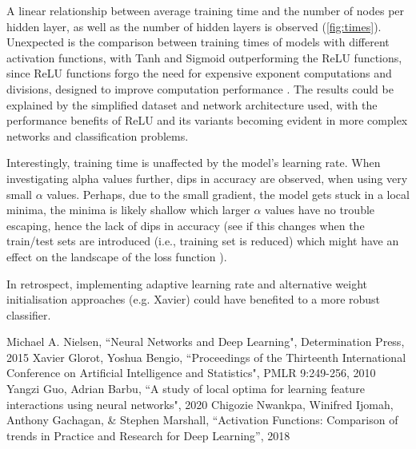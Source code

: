 \documentclass[12pt]{article}
\begin{document}
A linear relationship between average training time and the number of nodes per hidden layer, as well as the number of hidden layers is observed (\ref{fig:times}). Unexpected is the comparison between training times of models with different activation functions, with Tanh and Sigmoid outperforming the ReLU functions, since ReLU functions forgo the need for expensive exponent computations and divisions, designed to improve computation performance \cite{Niwa}. The results could be explained by the simplified dataset and network architecture used, with the performance benefits of ReLU and its variants becoming evident in more complex networks and classification problems.

Interestingly, training time is unaffected by the model's learning rate. When investigating alpha values further, dips in accuracy are observed, when using very small $\alpha$ values. Perhaps, due to the small gradient, the model gets stuck in a local minima, the minima is likely shallow which larger $\alpha$ values have no trouble escaping, hence the lack of dips in accuracy (see if this changes when the train/test sets are introduced (i.e., training set is reduced) which might have an effect on the landscape of the loss function \cite{Guo}).

In retrospect, implementing adaptive learning rate and alternative weight initialisation approaches (e.g. Xavier) could have benefited to a more robust classifier.

\begin{thebibliography}{10}
 Michael A. Nielsen, ``Neural Networks and Deep Learning", Determination Press, 2015
Xavier Glorot, Yoshua Bengio, ``Proceedings of the Thirteenth International Conference on Artificial Intelligence and Statistics", PMLR 9:249-256, 2010
  Yangzi Guo, Adrian Barbu, ``A study of local optima for learning feature interactions using neural networks", 2020
 Chigozie Nwankpa, Winifred Ijomah, Anthony Gachagan, \& Stephen Marshall, ``Activation Functions: Comparison of trends in Practice and Research for Deep Learning'', 2018

\end{thebibliography}
\end{document}
